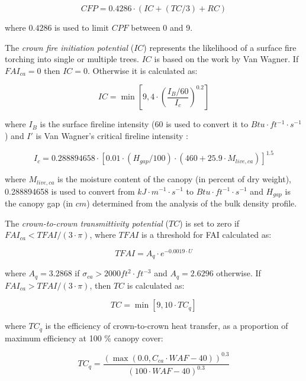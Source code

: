 \documentclass[]{book}
\begin{document}
\begin{equation}
CFP = 0.4286 \cdot (IC+(TC/3)+RC)
\end{equation}

where \(0.4286\) is used to limit \(CPF\) between 0 and 9.

The \emph{crown fire initiation potential} (\(IC\)) represents the
likelihood of a surface fire torching into single or multiple trees.
\(IC\) is based on the work by Van Wagner. If \(FAI_{ca} = 0\) then
\(IC = 0\). Otherwise it is calculated as:

\begin{equation}
IC = \min \left[ 9, 4 \cdot \left(\frac{I_B/60}{I_c}\right)^{0.2}\right]
\end{equation}

where \(I_B\) is the surface fireline intensity (60 is used to convert
it to \(Btu\cdot ft^{-1} \cdot s^{-1}\)) and \(I'\) is Van Wagner's
critical fireline intensity \citep{Scott2002}:

\begin{equation}
I_c = 0.288894658 \cdot \left[ 0.01\cdot (H_{gap}/100) \cdot (460 +25.9\cdot M_{live, ca})\right]^{1.5}
\end{equation}

where \(M_{live, ca}\) is the moisture content of the canopy (in percent
of dry weight), 0.288894658 is used to convert from
\(kJ \cdot m^{-1}\cdot s^{-1}\) to \(Btu \cdot ft^{-1}\cdot s^{-1}\) and
\(H_{gap}\) is the canopy gap (in \(cm\)) determined from the analysis
of the bulk density profile.

The \emph{crown-to-crown transmittivity potential} (\(TC\)) is set to
zero if \(FAI_{ca} < TFAI/(3\cdot \pi)\), where \(TFAI\) is a threshold
for FAI calculated as:

\begin{equation}
TFAI = A_{q}\cdot e^{-0.0019 \cdot U}
\end{equation}

where \(A_{q} = 3.2868\) if \(\sigma_{ca} > 2000 ft^{2}\cdot ft^{-3}\)
and \(A_{q} = 2.6296\) otherwise. If \(FAI_{ca} > TFAI/(3\cdot \pi)\),
then \(TC\) is calculated as:

\begin{equation}
TC = \min \left[ 9, 10 \cdot TC_q \right]
\end{equation}

where \(TC_q\) is the efficiency of crown-to-crown heat transfer, as a
proportion of maximum efficiency at 100 \% canopy cover:

\begin{equation}
TC_q = \frac{(\max(0.0, C_{ca}\cdot WAF - 40))^{0.3}}{(100 \cdot WAF -40)^{0.3}}
\end{equation}
\end{document}
